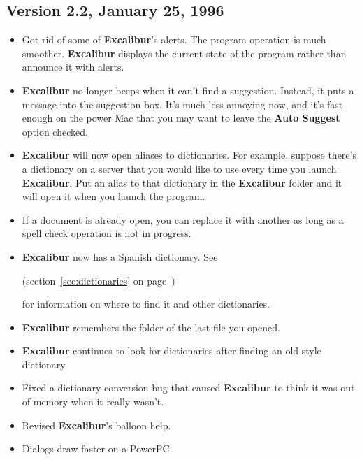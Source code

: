 ﻿\documentclass[11pt,titlepage]{article}
\newcommand{\ex}{\textbf{Excalibur}}
\begin{document}
\subsection{Version 2.2, January 25, 1996}

\begin{itemize}

\item Got rid of some of \ex's alerts.  The program operation is much
  smoother.  \ex{} displays the current state of the program rather
  than announce it with alerts.

\item \ex{} no longer beeps when it can't find a suggestion.  Instead,
  it puts a message into the suggestion box.  It's much less annoying
  now, and it's fast enough on the power Mac that you may want to
  leave the \textbf{Auto Suggest} option checked.

\item \ex{} will now open aliases to dictionaries.  For example,
  suppose there's a dictionary on a server that you would like to use
  every time you launch \ex.  Put an alias to that dictionary in the
  \ex{} folder and it will open it when you launch the program.

\item If a document is already open, you can replace it with another
  as long as a spell check operation is not in progress.

\item \ex{} now has a Spanish dictionary.  See 
    \begin{latexonly}
      (section~\ref{sec:dictionaries} on
      page~\pageref{sec:dictionaries})
    \end{latexonly}
    for information on where to find it and other dictionaries.

\item \ex{} remembers the folder of the last file you opened.

\item \ex{} continues to look for dictionaries after finding an old
  style dictionary.

\item Fixed a dictionary conversion bug that caused \ex{} to think it
  was out of memory when it really wasn't.

\item Revised \ex's balloon help.

\item Dialogs draw faster on a PowerPC.


\end{itemize}
\end{document}
